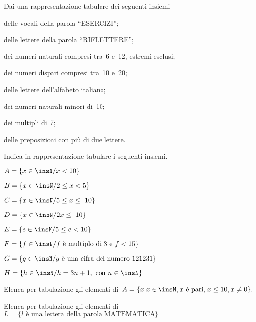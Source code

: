 \begin{esercizio}
\label{ese:6.2}
Dai una rappresentazione tabulare dei seguenti insiemi
\begin{enumeratea}
 \item delle vocali della parola ``ESERCIZI'';
 \item delle lettere della parola ``RIFLETTERE'';
 \item dei numeri naturali compresi tra~6 e~12, estremi esclusi;
 \item dei numeri dispari compresi tra~10 e~20;
 \item delle lettere dell'alfabeto italiano;
 \item dei numeri naturali minori di~10;
 \item dei multipli di~7;
 \item delle preposizioni con più di due lettere.
\end{enumeratea}
\end{esercizio}

\begin{esercizio}
 \label{ese:6.3}
Indica in rappresentazione tabulare i seguenti insiemi.
\TabPositions{7.5cm}
\begin{enumeratea}
 \item $A=\{x\in\insN/x<10\}$\tab\dotfill
 \item $B=\{x\in\insN/2\le x<5\}$\tab\dotfill
 \item $C=\{x\in\insN/5\le x\le~10\}$\tab\dotfill
 \item $D=\{x\in\insN/2x\le~10\}$ \tab\dotfill
 \item $E=\{e\in\insN/5\le e<10\}$\tab\dotfill
 \item $F=\{f\in\insN/f\text{ è multiplo di~3 e } f<15\}$\tab\dotfill
 \item $G=\{g\in\insN/g\text{ è una cifra del numero }121231\}$\tab\dotfill
 \item $H=\{h\in\insN/h=3n+1,\text{ con }n\in\insN\}$\tab\dotfill
\end{enumeratea}
\end{esercizio}

\begin{esercizio}
\label{ese:6.4}
Elenca per tabulazione gli elementi di~$A=\{x|x\in\insN, x\text{ è pari, 
}x\leq10, x\neq0\}.$
\end{esercizio}

\begin{esercizio}
\label{ese:6.5}
Elenca per tabulazione gli elementi di~$L=\{l\text{ è una lettera della parola 
MATEMATICA}\}$
\end{esercizio}

